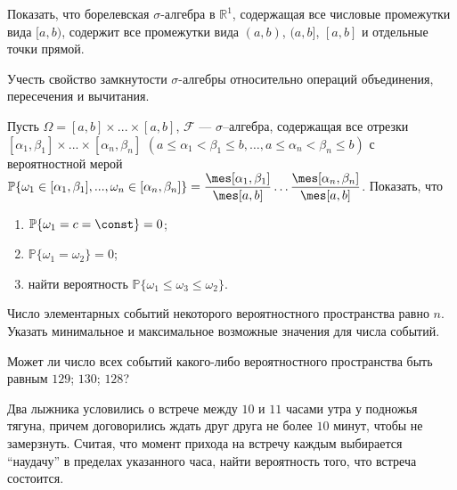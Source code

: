 
\begin{problem}
Показать, что борелевская $\sigma$-алгебра в ${\mathbb R}^1$, содержащая все числовые промежутки вида $[a,b)$, 
содержит все промежутки вида $(a,b)$, $(a,b]$, $[a,b]$ и отдельные точки прямой. 

\begin{ordre}
Учесть свойство замкнутости $\sigma$-алгебры относительно операций 
объединения, пересечения и вычитания. 
\end{ordre}

\end{problem}


\begin{problem}
Пусть $\Omega = [a,b]\times...\times[a,b]$, $\mathcal{F}$ --- $\sigma$–алгебра, содержащая все отрезки 
$[\alpha_1,\beta_1]\times...\times[\alpha_n,\beta_n]$ $(a \leqslant \alpha_1 < \beta_1 \leqslant b, \ldots, a \leqslant \alpha_n < \beta_n \leqslant b)$ с вероятностной мерой 
${\mathbb P}\{ \omega_1  \in [\alpha_1,\beta_1], ..., \omega_n  \in [\alpha_n,\beta_n]  \}=\dfrac{\mes[\alpha_1, \beta_1]}{\mes[a,b]}  \ldots  \dfrac{\mes[\alpha_n, \beta_n]}{\mes[a,b]}$. 
Показать, что 
\begin{enumerate}
\item ${\mathbb P}\{ \omega_1=c=\const\}=0$; 
\item ${\mathbb P}\{ \omega_1=\omega_2\}=0$;
\item найти вероятность ${\mathbb P}\{ \omega_1 \leq \omega_3 \leq \omega_2\}$. 
\end{enumerate}

\end{problem}


\begin{problem}
Число элементарных событий некоторого вероятностного пространства равно $n$. Указать минимальное и максимальное возможные значения 
для числа событий. 
\end{problem}

\begin{problem}
Может ли число всех событий какого-либо вероятностного пространства быть равным $129$; $130$; $128$? 
\end{problem}


\begin{problem}
\label{L_extension}
Два лыжника условились о встрече между $10$ и $11$ часами утра у подножья тягуна, причем договорились ждать друг друга не более $10$ минут, чтобы не замерзнуть. Считая, что момент прихода на встречу каждым выбирается ``наудачу'' в пределах указанного часа, найти вероятность того, что встреча состоится. 
\end{problem}

